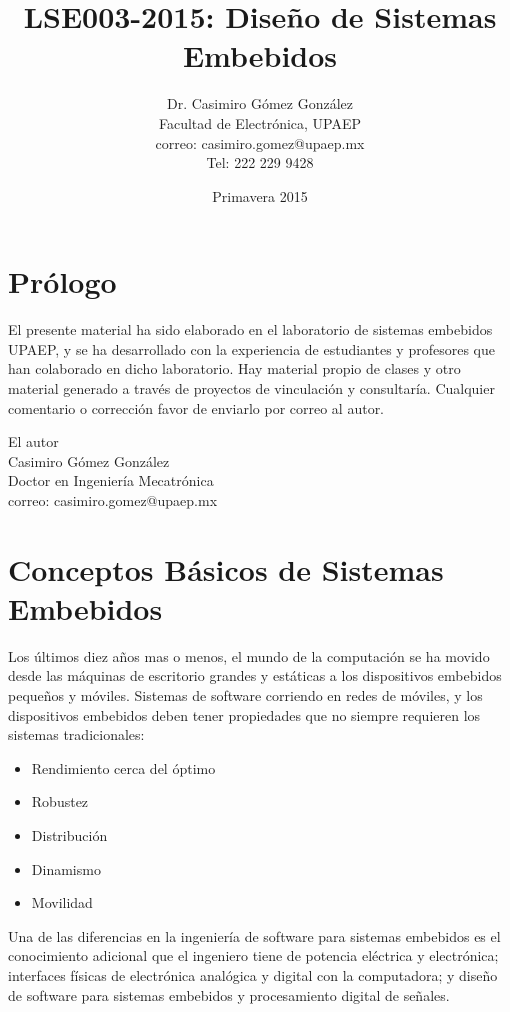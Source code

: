 \documentclass[12pt,twoside]{book}
\title{LSE003-2015: Diseño de Sistemas Embebidos}
\author{Dr. Casimiro Gómez González\\
	Facultad de Electrónica, UPAEP\\
               correo: casimiro.gomez@upaep.mx\\
               Tel: 222 229 9428}
\date{Primavera 2015}
\begin{document}
\maketitle

\chapter*{Prólogo}

El presente material ha sido elaborado en el laboratorio de sistemas embebidos UPAEP, y se ha desarrollado con la experiencia de estudiantes y profesores que han colaborado en dicho laboratorio. Hay material propio de clases y otro material generado a través de proyectos de vinculación y consultaría. Cualquier comentario o corrección favor de enviarlo por correo al autor.

\begin{flushright}
	
	El autor\\
	Casimiro Gómez González\\
	Doctor en Ingeniería Mecatrónica \\
	correo: casimiro.gomez@upaep.mx
\end{flushright}

\tableofcontents


\chapter{Conceptos Básicos de Sistemas Embebidos}

Los últimos diez años mas o menos, el mundo de la computación se ha movido desde las máquinas de escritorio grandes y estáticas a los dispositivos embebidos pequeños y móviles. Sistemas de software corriendo en redes de móviles, y los dispositivos embebidos deben tener propiedades que no siempre requieren los sistemas tradicionales:
\begin{itemize}
	\item Rendimiento cerca del óptimo
	\item Robustez
	\item Distribución
	\item Dinamismo
	\item Movilidad
\end{itemize}

Una de las diferencias en la ingeniería de software para sistemas embebidos es el conocimiento adicional que el ingeniero tiene de potencia eléctrica y electrónica; interfaces físicas de electrónica analógica y digital con la computadora; y diseño de software para sistemas embebidos y procesamiento digital de señales.
\end{document}
